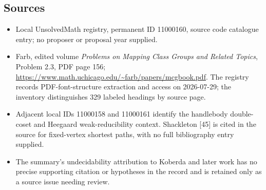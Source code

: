 \documentclass[11pt]{article}
\begin{document}
\subsection{Sources}
\begin{itemize}
\item Local UnsolvedMath registry, permanent ID 11000160, source code catalogue entry; no proposer or proposal year supplied.
\item Farb, edited volume \emph{Problems on Mapping Class Groups and Related Topics}, Problem 2.3, PDF page 156; \url{https://www.math.uchicago.edu/~farb/papers/mcgbook.pdf}. The registry records PDF-font-structure extraction and access on 2026-07-29; the inventory distinguishes 329 labeled headings by source page.
\item Adjacent local IDs 11000158 and 11000161 identify the handlebody double-coset and Heegaard weak-reducibility context. Shackleton [45] is cited in the source for fixed-vertex shortest paths, with no full bibliography entry supplied.
\item The summary's undecidability attribution to Koberda and later work has no precise supporting citation or hypotheses in the record and is retained only as a source issue needing review.
\end{itemize}
\end{document}
